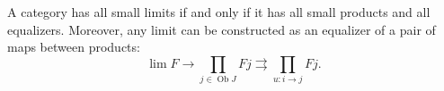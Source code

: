 A category has all small limits if and only if it has all small products and all equalizers. Moreover, any limit can be constructed as an equalizer of a pair of maps between products:
\[
\lim F \longrightarrow \prod_{j \in \operatorname{Ob}J} Fj \rightrightarrows \prod_{u: i \rightarrow j} Fj.
\]